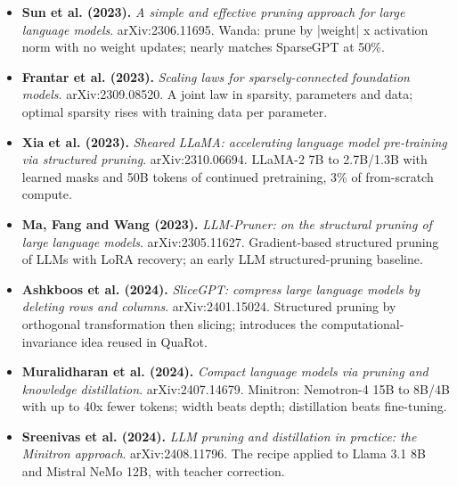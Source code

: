 \documentclass[11pt,letterpaper]{article}
\begin{document}
\begin{itemize}[leftmargin=1.2em,itemsep=3pt]
\item \textbf{Sun et al. (2023).} \textit{A simple and effective pruning approach for large language models}. arXiv:2306.11695. Wanda: prune by |weight| x activation norm with no weight updates; nearly matches SparseGPT at 50\%.
\item \textbf{Frantar et al. (2023).} \textit{Scaling laws for sparsely-connected foundation models}. arXiv:2309.08520. A joint law in sparsity, parameters and data; optimal sparsity rises with training data per parameter.
\item \textbf{Xia et al. (2023).} \textit{Sheared LLaMA: accelerating language model pre-training via structured pruning}. arXiv:2310.06694. LLaMA-2 7B to 2.7B/1.3B with learned masks and 50B tokens of continued pretraining, 3\% of from-scratch compute.
\item \textbf{Ma, Fang and Wang (2023).} \textit{LLM-Pruner: on the structural pruning of large language models}. arXiv:2305.11627. Gradient-based structured pruning of LLMs with LoRA recovery; an early LLM structured-pruning baseline.
\item \textbf{Ashkboos et al. (2024).} \textit{SliceGPT: compress large language models by deleting rows and columns}. arXiv:2401.15024. Structured pruning by orthogonal transformation then slicing; introduces the computational-invariance idea reused in QuaRot.
\item \textbf{Muralidharan et al. (2024).} \textit{Compact language models via pruning and knowledge distillation}. arXiv:2407.14679. Minitron: Nemotron-4 15B to 8B/4B with up to 40x fewer tokens; width beats depth; distillation beats fine-tuning.
\item \textbf{Sreenivas et al. (2024).} \textit{LLM pruning and distillation in practice: the Minitron approach}. arXiv:2408.11796. The recipe applied to Llama 3.1 8B and Mistral NeMo 12B, with teacher correction.
\end{itemize}
\end{document}
